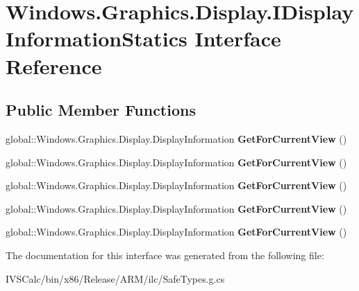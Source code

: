 \hypertarget{interface_windows_1_1_graphics_1_1_display_1_1_i_display_information_statics}{}\section{Windows.\+Graphics.\+Display.\+I\+Display\+Information\+Statics Interface Reference}
\label{interface_windows_1_1_graphics_1_1_display_1_1_i_display_information_statics}
\subsection*{Public Member Functions}
\begin{DoxyCompactItemize}
\item 
\mbox{\label{interface_windows_1_1_graphics_1_1_display_1_1_i_display_information_statics_aa58743db67599da1bdf1bb6a5d4351b6}} 
global\+::\+Windows.\+Graphics.\+Display.\+Display\+Information {\bfseries Get\+For\+Current\+View} ()
\item 
\mbox{\label{interface_windows_1_1_graphics_1_1_display_1_1_i_display_information_statics_aa58743db67599da1bdf1bb6a5d4351b6}} 
global\+::\+Windows.\+Graphics.\+Display.\+Display\+Information {\bfseries Get\+For\+Current\+View} ()
\item 
\mbox{\label{interface_windows_1_1_graphics_1_1_display_1_1_i_display_information_statics_aa58743db67599da1bdf1bb6a5d4351b6}} 
global\+::\+Windows.\+Graphics.\+Display.\+Display\+Information {\bfseries Get\+For\+Current\+View} ()
\item 
\mbox{\label{interface_windows_1_1_graphics_1_1_display_1_1_i_display_information_statics_aa58743db67599da1bdf1bb6a5d4351b6}} 
global\+::\+Windows.\+Graphics.\+Display.\+Display\+Information {\bfseries Get\+For\+Current\+View} ()
\item 
\mbox{\label{interface_windows_1_1_graphics_1_1_display_1_1_i_display_information_statics_aa58743db67599da1bdf1bb6a5d4351b6}} 
global\+::\+Windows.\+Graphics.\+Display.\+Display\+Information {\bfseries Get\+For\+Current\+View} ()
\end{DoxyCompactItemize}


The documentation for this interface was generated from the following file\+:\begin{DoxyCompactItemize}
\item 
I\+V\+S\+Calc/bin/x86/\+Release/\+A\+R\+M/ilc/Safe\+Types.\+g.\+cs\end{DoxyCompactItemize}
